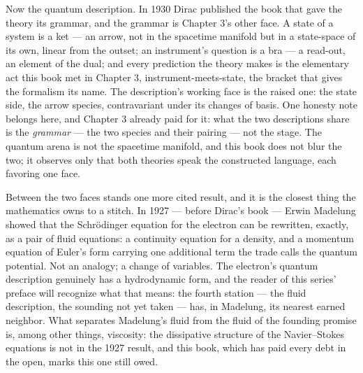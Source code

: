 Now the quantum description. In 1930 Dirac published the book that gave
the theory its grammar, and the grammar is Chapter 3's other face. A
state of a system is a ket --- an arrow, not in the spacetime manifold
but in a state-space of its own, linear from the outset; an instrument's
question is a bra --- a read-out, an element of the dual; and every
prediction the theory makes is the elementary act this book met in
Chapter 3, instrument-meets-state, the bracket that gives the formalism
its name. The description's working face is the raised one: the state
side, the arrow species, contravariant under its changes of basis. One
honesty note belongs here, and Chapter 3 already paid for it: what the
two descriptions share is the \emph{grammar} --- the two species and
their pairing --- not the stage. The quantum arena is not the spacetime
manifold, and this book does not blur the two; it observes only that
both theories speak the constructed language, each favoring one face.

Between the two faces stands one more cited result, and it is the
closest thing the mathematics owns to a stitch. In 1927 --- before
Dirac's book --- Erwin Madelung showed that the Schr\"odinger equation
for the electron can be rewritten, exactly, as a pair of fluid
equations: a continuity equation for a density, and a momentum equation
of Euler's form carrying one additional term the trade calls the quantum
potential. Not an analogy; a change of variables. The electron's quantum
description genuinely has a hydrodynamic form, and the reader of this
series' preface will recognize what that means: the fourth station ---
the fluid description, the sounding not yet taken --- has, in Madelung,
its nearest earned neighbor. What separates Madelung's fluid from the
fluid of the founding promise is, among other things, viscosity: the
dissipative structure of the Navier--Stokes equations is not in the
1927 result, and this book, which has paid every debt in the open,
marks this one still owed.

